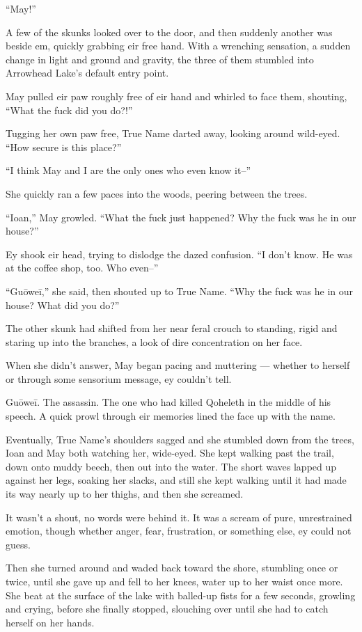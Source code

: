 ``May!''

A few of the skunks looked over to the door, and then suddenly another was beside em, quickly grabbing eir free hand. With a wrenching sensation, a sudden change in light and ground and gravity, the three of them stumbled into Arrowhead Lake's default entry point.

May pulled eir paw roughly free of eir hand and whirled to face them, shouting, ``What the fuck did you do?!''

Tugging her own paw free, True Name darted away, looking around wild-eyed. ``How secure is this place?''

``I think May and I are the only ones who even know it--''

She quickly ran a few paces into the woods, peering between the trees.

``Ioan,'' May growled. ``What the fuck just happened? Why the fuck was he in our house?''

Ey shook eir head, trying to dislodge the dazed confusion. ``I don't know. He was at the coffee shop, too. Who even--''

``Guōweī,'' she said, then shouted up to True Name. ``Why the fuck was he in our house? What did you do?''

The other skunk had shifted from her near feral crouch to standing, rigid and staring up into the branches, a look of dire concentration on her face.

When she didn't answer, May began pacing and muttering — whether to herself or through some sensorium message, ey couldn't tell.

Guōweī. The assassin. The one who had killed Qoheleth in the middle of his speech. A quick prowl through eir memories lined the face up with the name.

Eventually, True Name's shoulders sagged and she stumbled down from the trees, Ioan and May both watching her, wide-eyed. She kept walking past the trail, down onto muddy beech, then out into the water. The short waves lapped up against her legs, soaking her slacks, and still she kept walking until it had made its way nearly up to her thighs, and then she screamed.

It wasn't a shout, no words were behind it. It was a scream of pure, unrestrained emotion, though whether anger, fear, frustration, or something else, ey could not guess.

Then she turned around and waded back toward the shore, stumbling once or twice, until she gave up and fell to her knees, water up to her waist once more. She beat at the surface of the lake with balled-up fists for a few seconds, growling and crying, before she finally stopped, slouching over until she had to catch herself on her hands.

